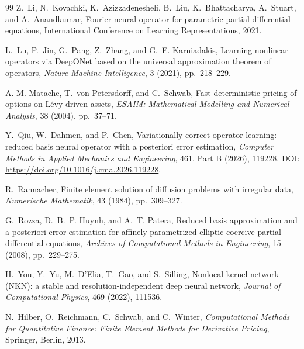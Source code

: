 \documentclass[11pt]{amsart}
\theoremstyle{remark}
\begin{document}
\begin{thebibliography}{99}
Z.~Li, N.~Kovachki, K.~Azizzadenesheli, B.~Liu, K.~Bhattacharya, A.~Stuart,
and A.~Anandkumar,
\newblock Fourier neural operator for parametric partial differential
equations,
\newblock International Conference on Learning Representations, 2021.

L.~Lu, P.~Jin, G.~Pang, Z.~Zhang, and G.~E. Karniadakis,
\newblock Learning nonlinear operators via DeepONet based on the universal
approximation theorem of operators,
\newblock \emph{Nature Machine Intelligence}, 3 (2021), pp.~218--229.

A.-M. Matache, T.~von Petersdorff, and C.~Schwab,
\newblock Fast deterministic pricing of options on L\'evy driven assets,
\newblock \emph{ESAIM: Mathematical Modelling and Numerical Analysis},
38 (2004), pp.~37--71.

Y.~Qiu, W.~Dahmen, and P.~Chen,
\newblock Variationally correct operator learning: reduced basis neural
operator with a posteriori error estimation,
\newblock \emph{Computer Methods in Applied Mechanics and Engineering},
461, Part B (2026), 119228.
DOI: \url{https://doi.org/10.1016/j.cma.2026.119228}.

R.~Rannacher,
\newblock Finite element solution of diffusion problems with irregular data,
\newblock \emph{Numerische Mathematik}, 43 (1984), pp.~309--327.

G.~Rozza, D.~B.~P. Huynh, and A.~T. Patera,
\newblock Reduced basis approximation and a posteriori error estimation for
affinely parametrized elliptic coercive partial differential equations,
\newblock \emph{Archives of Computational Methods in Engineering},
15 (2008), pp.~229--275.

H.~You, Y.~Yu, M.~D'Elia, T.~Gao, and S.~Silling,
\newblock Nonlocal kernel network (NKN): a stable and resolution-independent
deep neural network,
\newblock \emph{Journal of Computational Physics}, 469 (2022), 111536.

N.~Hilber, O.~Reichmann, C.~Schwab, and C.~Winter,
\newblock \emph{Computational Methods for Quantitative Finance: Finite Element
Methods for Derivative Pricing},
\newblock Springer, Berlin, 2013.

\end{thebibliography}
\end{document}
